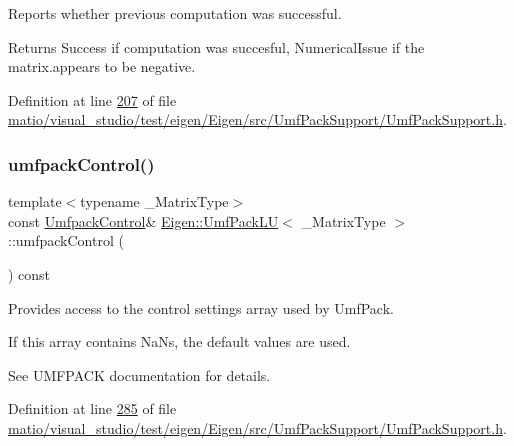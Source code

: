 Reports whether previous computation was successful. 

\begin{DoxyReturn}{Returns}
{\ttfamily Success} if computation was succesful, {\ttfamily Numerical\+Issue} if the matrix.\+appears to be negative. 
\end{DoxyReturn}


Definition at line \hyperlink{matio_2visual__studio_2test_2eigen_2_eigen_2src_2_umf_pack_support_2_umf_pack_support_8h_source_l00207}{207} of file \hyperlink{matio_2visual__studio_2test_2eigen_2_eigen_2src_2_umf_pack_support_2_umf_pack_support_8h_source}{matio/visual\+\_\+studio/test/eigen/\+Eigen/src/\+Umf\+Pack\+Support/\+Umf\+Pack\+Support.\+h}.

\mbox{\label{class_eigen_1_1_umf_pack_l_u_ae83d178202f3d44c1789c1c93842bf2e}} 
\subsubsection{\texorpdfstring{umfpack\+Control()}{umfpackControl()}\hspace{0.1cm}{\footnotesize\ttfamily [1/4]}}
{\footnotesize\ttfamily template$<$typename \+\_\+\+Matrix\+Type$>$ \\
const \hyperlink{group___core___module}{Umfpack\+Control}\& \hyperlink{class_eigen_1_1_umf_pack_l_u}{Eigen\+::\+Umf\+Pack\+LU}$<$ \+\_\+\+Matrix\+Type $>$\+::umfpack\+Control (\begin{DoxyParamCaption}{ }\end{DoxyParamCaption}) const\hspace{0.3cm}{\ttfamily [inline]}}

Provides access to the control settings array used by Umf\+Pack.

If this array contains NaN\textquotesingle{}s, the default values are used.

See U\+M\+F\+P\+A\+CK documentation for details. 

Definition at line \hyperlink{matio_2visual__studio_2test_2eigen_2_eigen_2src_2_umf_pack_support_2_umf_pack_support_8h_source_l00285}{285} of file \hyperlink{matio_2visual__studio_2test_2eigen_2_eigen_2src_2_umf_pack_support_2_umf_pack_support_8h_source}{matio/visual\+\_\+studio/test/eigen/\+Eigen/src/\+Umf\+Pack\+Support/\+Umf\+Pack\+Support.\+h}.

